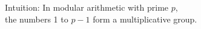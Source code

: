\documentclass[preview]{standalone}
\begin{document}
\begin{center}
Intuition: In modular arithmetic with prime $p$,\\the numbers 1 to $p-1$ form a multiplicative group.
\end{center}
\end{document}
